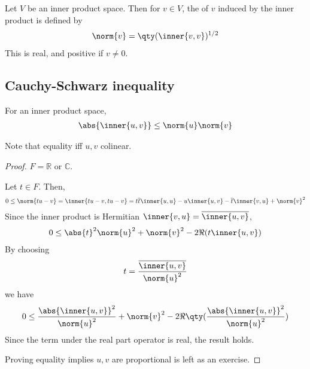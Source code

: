 \begin{definition}[Norm]
	Let $V$ be an inner product space.
	Then for $v \in V$, the  of $v$ induced by the inner product is defined by
	\begin{align*}
		\norm{v} = \qty(\inner{v,v})^{1/2}
	\end{align*}
	This is real, and positive if $v \neq 0$.
\end{definition}

\subsection{Cauchy-Schwarz inequality}
\begin{lemma}
	For an inner product space,
	\begin{align*}
		\abs{\inner{u,v}} \leq \norm{u} \norm{v}
	\end{align*}
\end{lemma}

\begin{remark}
	Note that equality iff $u, v$ colinear.
\end{remark} 

\begin{proof}
	$F = \mathbb{R}$ or $\mathbb{C}$.

	Let $t \in F$.
	Then,
	\begin{align*}
		0 \leq \norm{t u - v} = \inner{tu - v, tu - v} = t \overline t \inner{u,u} - u \inner{u,v} - \overline t \inner{v,u} + \norm{v}^2
	\end{align*}
	Since the inner product is Hermitian $\inner{v, u} = \overline{\inner{u, v}}$,
	\begin{align*}
		0 \leq \abs{t}^2 \norm{u}^2 + \norm{v}^2 - 2 \Re(t \inner{u,v})
	\end{align*}
	By choosing
	\begin{align*}
		t = \frac{\overline{\inner{u,v}}}{\norm{u}^2}
	\end{align*}
	we have
	\begin{align*}
		0 \leq \frac{\abs{\inner{u,v}}^2}{\norm{u}^2} + \norm{v}^2 - 2 \Re\qty(\frac{\abs{\inner{u,v}}^2}{\norm{u}^2})
	\end{align*}
	Since the term under the real part operator is real, the result holds.

	Proving equality implies $u, v$ are proportional is left as an exercise.
\end{proof}


